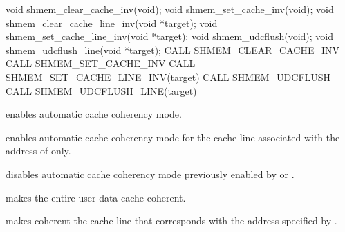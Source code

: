 \synC   %

void shmem_clear_cache_inv(void);
void shmem_set_cache_inv(void);
void shmem_clear_cache_line_inv(void *target);
void shmem_set_cache_line_inv(void *target);
void shmem_udcflush(void);
void shmem_udcflush_line(void *target);
\synF   %
CALL SHMEM_CLEAR_CACHE_INV
CALL SHMEM_SET_CACHE_INV
CALL SHMEM_SET_CACHE_LINE_INV(target)
CALL SHMEM_UDCFLUSH
CALL SHMEM_UDCFLUSH_LINE(target)

{   
 enables automatic cache coherency mode.

 enables automatic cache coherency mode for the
cache line associated with the address of  only.

 disables automatic cache coherency mode
previously enabled by  or .

 makes the entire user data cache coherent.

 makes coherent the cache line that corresponds with
the address specified by .
}
{
}
\eAPI 

